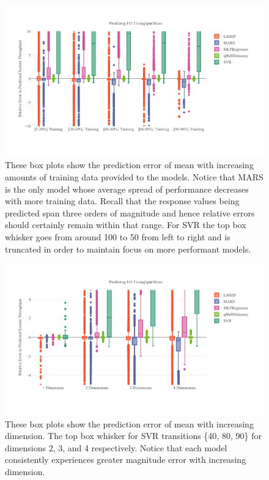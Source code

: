 \documentclass{scspaperproc}
\theoremstyle{scsthe}
\begin{document}
\begin{figure}
  \centering
  \includegraphics[width=\textwidth,trim={0 .5in 0 .5in}]{Mean_TT_Ratio.pdf}
  \caption{These box plots show the prediction error of mean with
    increasing amounts of training data provided to the models. Notice
    that MARS is the only model whose average spread of performance
    decreases with more training data. Recall that the response values
    being predicted span three orders of magnitude and hence relative
    errors should certainly remain within that range. For SVR the top
    box whisker goes from around 100 to 50 from left to right and is
    truncated in order to maintain focus on more performant models.}
  \label{fig:mean_tt_ratio}
\end{figure}

\begin{figure}
  \centering
  \includegraphics[width=\textwidth,trim={0 .5in 0 .5in}]{Mean_Dim.pdf}
  \caption{These box plots show the prediction error of mean with
    increasing dimension. The top box whisker for SVR transitions
    \{40, 80, 90\} for dimensions 2, 3, and 4 respectively. Notice
    that each model consistently experiences greater magnitude error
    with increasing dimension.}
  \label{fig:mean_dim}
\end{figure}
\end{document}
